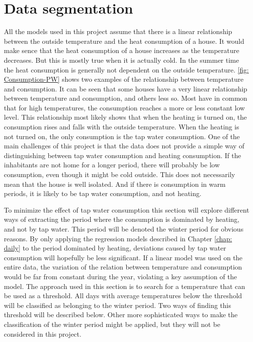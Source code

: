 \section{Data segmentation}
All the models used in this project assume that there is a linear relationship between the outside temperature and the heat consumption of a house. It would make sence that the heat consumption of a house increases as the temperature decreases. But this is mostly true when it is actually cold. In the summer time the heat consumption is generally not dependent on the outside temperature. \cref{fig: Consumption-PW} shows two examples of the relationship between temperature and consumption. It can be seen that some houses have a very linear relationship between temperature and consumption, and others less so. Most have in common that for high temperatures, the consumption reaches a more or less constant low level. This relationship most likely shows that when the heating is turned on, the consumption rises and falls with the outside temperature. When the heating is not turned on, the only consumption is the tap water consumption. One of the main challenges of this project is that the data does not provide a simple way of distinguishing between tap water consumption and heating consumption. If the inhabitants are not home for a longer period, there will probably be low consumption, even though it might be cold outside. This does not necessarily mean that the house is well isolated. And if
there is consumption in warm periods, it is likely to be tap water consumption, and not heating.

\noindent To minimize the effect of tap water consumption this section will explore different ways of extracting the period where the consumption is dominated by heating, and not by tap water. This period will be denoted the winter period for obvious reasons. By only applying the regression models described in Chapter \ref{chap: daily} to the period dominated by heating, deviations caused by tap water consumption will hopefully be less significant. If a linear model was used on the entire data, the variation of the relation between temperature and consumption would be far from constant during the year, violating a key assumption of the model. The approach used in this section is to search for a temperature that can be used as a threshold. All days with average temperatures below the threshold will be classified as belonging to the winter period. Two ways of finding this threshold will be described below. Other more sophisticated ways to make the classification of the winter period might be applied, but they will not be considered in this project.


